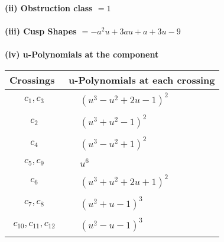 \documentclass[1p]{elsarticle_modified}
\theoremstyle{definition}
\begin{document}
\flushleft \textbf{(ii) Obstruction class $= 1$}\\~\\
\flushleft \textbf{(iii) Cusp Shapes $= - a^2 u+3 a u+a+3 u-9$}\\~\\
\newpage\renewcommand{\arraystretch}{1}
\flushleft \textbf{(iv) u-Polynomials at the component}\newline \\
\begin{tabular}{m{50pt}|m{274pt}}
Crossings & \hspace{64pt}u-Polynomials at each crossing \\
\hline $$\begin{aligned}c_{1},c_{3}\end{aligned}$$&$\begin{aligned}
&(u^3- u^2+2 u-1)^2
\end{aligned}$\\
\hline $$\begin{aligned}c_{2}\end{aligned}$$&$\begin{aligned}
&(u^3+u^2-1)^2
\end{aligned}$\\
\hline $$\begin{aligned}c_{4}\end{aligned}$$&$\begin{aligned}
&(u^3- u^2+1)^2
\end{aligned}$\\
\hline $$\begin{aligned}c_{5},c_{9}\end{aligned}$$&$\begin{aligned}
&u^6
\end{aligned}$\\
\hline $$\begin{aligned}c_{6}\end{aligned}$$&$\begin{aligned}
&(u^3+u^2+2 u+1)^2
\end{aligned}$\\
\hline $$\begin{aligned}c_{7},c_{8}\end{aligned}$$&$\begin{aligned}
&(u^2+u-1)^3
\end{aligned}$\\
\hline $$\begin{aligned}c_{10},c_{11},c_{12}\end{aligned}$$&$\begin{aligned}
&(u^2- u-1)^3
\end{aligned}$\\
\hline
\end{tabular}\\~\\
\end{document}
